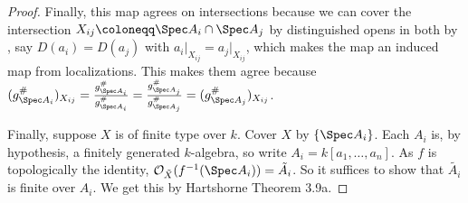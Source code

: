 \begin{proof}
	Finally, this map agrees on intersections because we can cover the intersection $X_{ij} \coloneqq \Spec A_i \cap \Spec A_j $ by distinguished opens in both by , say $D(a_i) = D(a_j) $ with $a_i\big|_{X_{ij}} = a_j\big|_{X_{ij}} $, which makes the map an induced map from localizations.
	This makes them agree because $(g^\#_{\Spec A_i})_{X_{ij}} = \frac{g^\#_{\Spec A_i}}{g^\#_{\Spec A_i}} = \frac{g^\#_{\Spec A_j}}{g^\#_{\Spec A_j}} = (g^\#_{\Spec A_j})_{X_{ij}}$.

	Finally, suppose $X $ is of finite type over $k $.
	Cover $X $ by $\{\Spec A_i\}   $.
	Each $A_i $ is, by hypothesis, a finitely generated $k $-algebra, so write $A_i = k[a_{1},\ldots,a_n] $.
	As $f $ is topologically the identity, $\mathcal{O}_{\tilde{X}}(f^{-1}(\Spec A_i)) = \tilde{A_i}$.
	So it suffices to show that $\tilde{A_i} $ is finite over $A_i $.
	We get this by Hartshorne Theorem 3.9a.
\end{proof}

